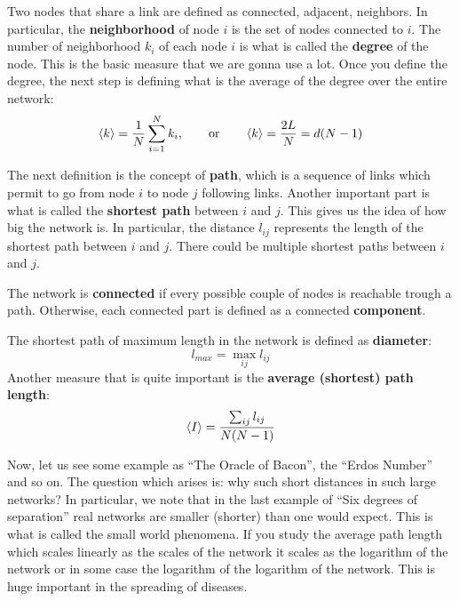 \documentclass[../main/main.tex]{subfiles}
\begin{document}
Two nodes that share a link are defined as connected, adjacent, neighbors. In particular, the \textbf{neighborhood} of node \( i \) is the set of nodes connected to \( i \).
The number of neighborhood \( k_i \) of each node \( i \) is what is called the \textbf{degree} of the node. This is the basic measure that we are gonna use a lot. Once you define the degree, the next step is defining what is the average of the degree over the entire network:
\begin{equation}
  \expval{k} = \frac{1}{N} \sum_{i=1}^{N} k_i, \qquad \text{or} \qquad \expval{k} = \frac{2L}{N} = d(N-1)
\end{equation}

The next definition is the concept of \textbf{path}, which is a sequence of links which permit to go from node \( i \) to node \( j \) following links.
Another important part is what is called the \textbf{shortest path} between \( i  \) and \( j \). This gives us the idea of how big the network is. In particular, the distance \( l_{ij} \) represents the length of the shortest path between \( i \) and \( j \). There could be multiple shortest paths between \( i \) and \( j \).

The network is \textbf{connected} if every possible couple of nodes is reachable trough a path. Otherwise, each connected part is defined as a connected \textbf{component}.


The shortest path of maximum length in the network is defined as \textbf{diameter}:
\begin{equation*}
  l_{max} = \max_{ij} l_{ij}
\end{equation*}
Another measure that is quite important is the \textbf{average (shortest) path length}:
\begin{equation*}
  \expval{I} = \frac{\sum_{ij}^{} l_{ij} }{N(N-1)}
\end{equation*}

Now, let us see some example as “The Oracle of Bacon”, the “Erdos Number” and so on.
The question which arises is: why such short distances in such large networks?
In particular, we note that in the last example of “Six degrees of separation” real networks are smaller (shorter) than one would expect.
This is what is called the small world phenomena. If you study the average path length which scales linearly as the scales of the network it scales as the logarithm of the network or in some case the logarithm of the logarithm of the network. This is huge important in the spreading of diseases.
\end{document}
